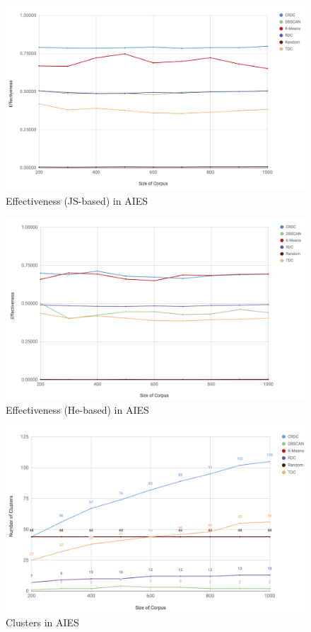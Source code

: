 \begin{figure}
  \includegraphics[scale=0.27]{effectivenessJS.png}
  \caption{Effectiveness (JS-based) in AIES}
  \label{fig:effectivenessJS}
\end{figure}

\begin{figure}
  \includegraphics[scale=0.27]{effectivenessHe.png}
  \caption{Effectiveness (He-based) in AIES}
  \label{fig:effectivenessHe}
\end{figure}

\begin{figure}
  \includegraphics[scale=0.27]{clusters.png}
  \caption{Clusters in AIES}
  \label{fig:clusters}
\end{figure}

